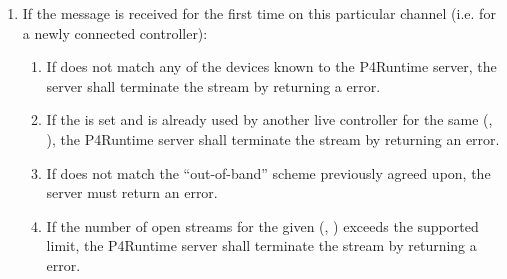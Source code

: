 \documentclass[11pt]{article}
\begin{document}
{\begin{enumerate}
\item{}
If the  message is received for the first time on
this particular channel (i.e. for a newly connected controller):%

\begin{enumerate}%

\item{}
If  does not match any of the devices known to the P4Runtime
server, the server shall terminate the stream by returning a
 error.%

\item{}
If the  is set and is already used by another live
controller for the same (, ), the P4Runtime server shall
terminate the stream by returning an  error.%

\item{}
If  does not match the \textquotedblleft{}out-of-band\textquotedblright{} scheme previously
agreed upon, the server must return an  error.%

\item{}
If the number of open streams for the given (, )
exceeds the supported limit, the P4Runtime server shall terminate the
stream by returning a  error.%


\end{enumerate}
\end{enumerate}}
\end{document}
